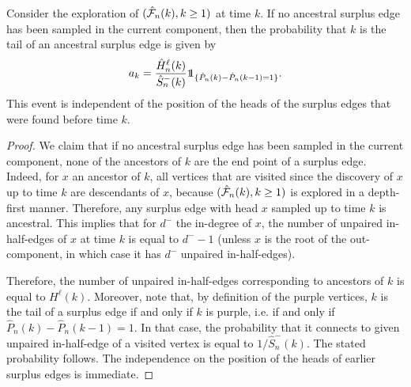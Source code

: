 \begin{lemma}\label{lemma.probancestral}
Consider the exploration of $(\hat{{\mathcal F}}_n(k),k\geq 1)$ at time $k$. If no ancestral surplus edge has been sampled in the current component, then the probability that $k$ is the tail of an ancestral surplus edge is given by 
$$a_k=\frac{\hat{H}^\ell_n(k)}{\hat{S}_n^-(k)}\one_{\{\hat{P}_n(k)-\hat{P}_n(k-1)=1\}}.$$
This event is independent of the position of the heads of the surplus edges that were found before time $k$.
\end{lemma}
\begin{proof}
We claim that if no ancestral surplus edge has been sampled in the current component, none of the ancestors of $k$ are the end point of a surplus edge. Indeed, for $x$ an ancestor of $k$, all vertices that are visited since the discovery of $x$ up to time $k$ are descendants of $x$, because $(\hat{{\mathcal F}}_n(k),k\geq 1)$ is explored in a depth-first manner. Therefore, any surplus edge with head $x$ sampled up to time $k$ is ancestral. This implies that for $d^-$ the in-degree of $x$, the number of unpaired in-half-edges of $x$ at time $k$ is equal to $d^--1$ (unless $x$ is the root of the out-component, in which case it has $d^-$ unpaired in-half-edges).

Therefore, the number of unpaired in-half-edges corresponding to ancestors of $k$ is equal to $H^\ell(k)$. Moreover, note that, by definition of the purple vertices, $k$ is the tail of a surplus edge if and only if $k$ is purple, i.e. if and only if $\hat{P}_n(k)-\hat{P}_n(k-1)=1$. In that case, the probability that it connects to given unpaired in-half-edge of a visited vertex is equal to $1/\hat{S}_n^-(k)$. The stated probability follows. The independence on the position of the heads of earlier surplus edges is immediate.
\end{proof}

